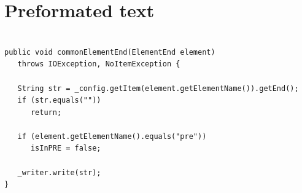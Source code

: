 \documentclass[a4paper,11pt]{article}
\begin{document}
\section{Preformated text}
\begin{verbatim}

public void commonElementEnd(ElementEnd element)
   throws IOException, NoItemException {
        
   String str = _config.getItem(element.getElementName()).getEnd();
   if (str.equals(""))
      return;
        
   if (element.getElementName().equals("pre"))
      isInPRE = false;
       
   _writer.write(str);
}
\end{verbatim}
\end{document}
